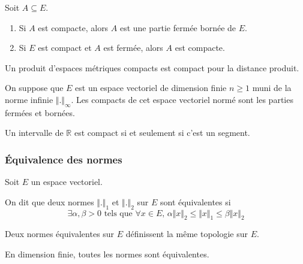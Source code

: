   \begin{proposition}
    Soit $A \subseteq E$.
    \begin{enumerate}[label={\bfseries(\roman*)}]
      \item Si $A$ est compacte, alors $A$ est une partie fermée bornée de $E$.
      \item Si $E$ est compact et $A$ est fermée, alors $A$ est compacte.
    \end{enumerate}
  \end{proposition}

  \begin{proposition}
    Un produit d'espaces métriques compacts est compact pour la distance produit.
  \end{proposition}

  \begin{proposition}
    On suppose que $E$ est un espace vectoriel de dimension finie $n \geq 1$ muni de la norme infinie $\Vert . \Vert_\infty$. Les compacts de cet espace vectoriel normé sont les parties fermées et bornées.
  \end{proposition}

  \begin{application}
    Un intervalle de $\mathbb{R}$ est compact si et seulement si c'est un segment.
  \end{application}

  \subsubsection{Équivalence des normes}


  Soit $E$ un espace vectoriel.

  \begin{definition}
    On dit que deux normes $\Vert . \Vert_1$ et $\Vert . \Vert_2$ sur $E$ sont équivalentes si
    \[ \exists \alpha, \beta > 0 \text{ tels que } \forall x \in E, \, \alpha \Vert x \Vert_2 \leq \Vert x \Vert_1 \leq \beta \Vert x \Vert_2 \]
  \end{definition}

  \begin{remark}
    Deux normes équivalentes sur $E$ définissent la même topologie sur $E$.
  \end{remark}


  \begin{theorem}
    En dimension finie, toutes les normes sont équivalentes.
  \end{theorem}

